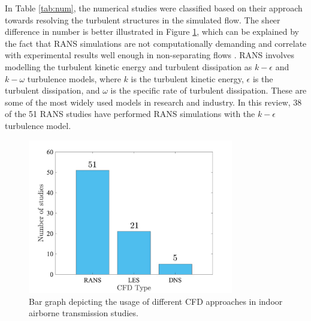 \documentclass[a4paper,12pt]{elsarticle}
\begin{document}
In Table \ref{tab:num}, the numerical studies were classified based on their approach towards resolving the turbulent structures in the simulated flow. The sheer difference in number is better illustrated in Figure \ref{fig:cfd}, which can be explained by the fact that RANS simulations are not computationally demanding and correlate with experimental results well enough in non-separating flows \cite{wu2023numerical}. RANS involves modelling the turbulent kinetic energy and turbulent dissipation as $k-\epsilon$ and $k-\omega$ turbulence models, where $k$ is the turbulent kinetic energy, $\epsilon$ is the turbulent dissipation, and $\omega$ is the specific rate of turbulent dissipation. These are some of the most widely used models in research and industry. In this review, 38 of the 51 RANS studies have performed RANS simulations with the $k-\epsilon$ turbulence model.

\begin{figure}[ht]
    \centering
    \includegraphics[width=0.8\textwidth]{figures/cfd.jpg}
    \caption{Bar graph depicting the usage of different CFD approaches in indoor airborne transmission studies.}
    \label{fig:cfd}
\end{figure}
\end{document}
